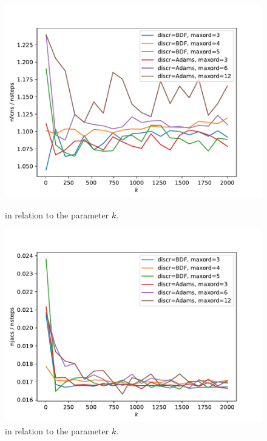 \documentclass{report}
\begin{document}
\begin{figure}[h]
\centering
\begin{minipage}[b]{0.45\textwidth}
\centering
\includegraphics[width=\textwidth]{../Plots/Task4/Figure_210}
\caption{ in relation to the parameter $k$.}
\label{pl:nfcns_nsteps1}
\end{minipage}
\hfill
\begin{minipage}[b]{0.45\textwidth}
\centering
\includegraphics[width=\textwidth]{../Plots/Task4/Figure_211}
\caption{ in relation to the parameter $k$.}
\label{pl:njacs_nsteps1}
\end{minipage}
\end{figure}
\end{document}
